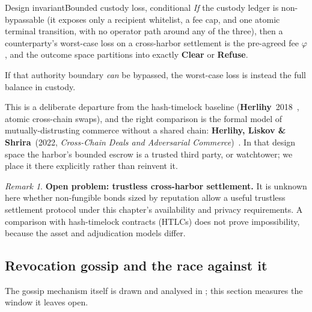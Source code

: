 \documentclass[11pt,a4paper]{article}
\theoremstyle{definition}
\theoremstyle{definition}
\theoremstyle{remark}
\newtheorem*{remark}{Remark}
\begin{document}
\begin{pdclaim}{Design invariant}{Bounded custody loss, conditional}
\setlength{\parskip}{4pt plus 1pt}
\label{thm:fh-escrow-bound}
\emph{If} the custody ledger is non-bypassable (it exposes only a recipient
whitelist, a fee cap, and one atomic terminal transition, with no operator path
around any of the three), then a counterparty's worst-case loss on a cross-harbor
settlement is the pre-agreed fee $\varphi$, and the outcome space partitions into
exactly \textbf{Clear} or \textbf{Refuse}.

If that authority boundary \emph{can} be
bypassed, the worst-case loss is instead the full balance in custody.
\end{pdclaim}
\fi

\noindent This is a deliberate departure from the
hash-timelock baseline (\textbf{Herlihy}~2018~, atomic cross-chain
swaps), and the right comparison is the formal model of mutually-distrusting
commerce without a shared chain: \textbf{Herlihy, Liskov \& Shrira}~(2022, \emph{
Cross-Chain Deals and Adversarial Commerce})~. In that design
space the harbor's bounded escrow is a trusted third party, or watchtower; we
place it there explicitly rather than reinvent it.

\begin{remark}\label{conj:trustless}
\textbf{Open problem: trustless cross-harbor settlement.} It is unknown here whether
non-fungible bonds sized by reputation allow a useful trustless settlement protocol
under this chapter's availability and privacy requirements. A comparison with
hash-timelock contracts (HTLCs) does not prove impossibility, because the asset
and adjudication models differ.
\end{remark}

\subsection{Revocation gossip and the race against it}\label{sec:fh-revocation}\label{sec:revocation}

\ifpdbook
The gossip mechanism itself is drawn and analysed in ;
this section measures the window it leaves open.
\else

\fi
\end{document}
